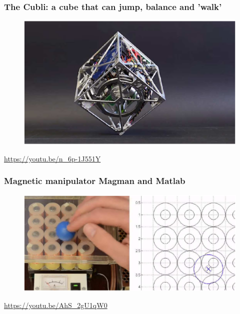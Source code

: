 \documentclass{beamer}
\begin{document}
\begin{frame}
\frametitle{The Cubli: a cube that can jump, balance and 'walk'}
\begin{figure}
\includegraphics[scale=0.4]{cubli}
\end{figure}
\url{https://youtu.be/n_6p-1J551Y}
\end{frame}


\begin{frame}
\frametitle{Magnetic manipulator Magman and Matlab}
\begin{figure}
\includegraphics[scale=0.35]{magnetic_manipulator}
\end{figure}
\url{https://youtu.be/AhS_2gU1qW0}
\end{frame}

\end{document}
